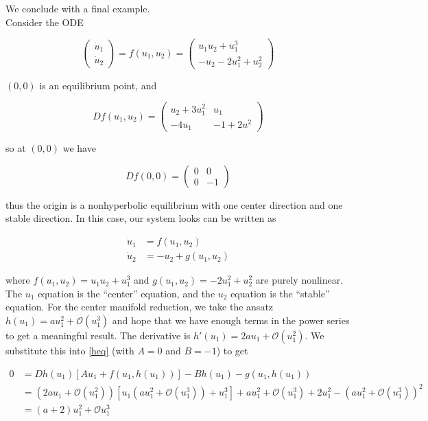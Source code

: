 \documentclass{article}
\begin{document}
We conclude with a final example.\\

Consider the ODE

\[
\begin{pmatrix}\dot{u}_1 \\ \dot{u}_2
\end{pmatrix}
= f(u_1, u_2)
= \begin{pmatrix} u_1 u_2 + u_1^3 \\ -u_2 - 2u_1^2 + u_2^2
\end{pmatrix}
\]

$(0,0)$ is an equilibrium point, and 

\[
Df(u_1, u_2) = \begin{pmatrix}
u_2 + 3 u_1^2 & u_1 \\
-4 u_1 & -1 + 2 u^2
\end{pmatrix}
\]

so at $(0, 0)$ we have

\[
Df(0, 0) = \begin{pmatrix}
0 & 0 \\
0 & -1
\end{pmatrix}
\]

thus the origin is a nonhyperbolic equilibrium with one center direction and one stable direction. In this case, our system looks can be written as

\begin{align*}
\dot{u}_1 &= f(u_1, u_2) \\
\dot{u}_2 &= -u_2 + g(u_1, u_2)
\end{align*}

where $f(u_1, u_2) = u_1 u_2 + u_1^3$ and $g(u_1, u_2) = - 2u_1^2 + u_2^2$ are purely nonlinear. The $u_1$ equation is the ``center'' equation, and the $u_2$ equation is the ``stable'' equation. For the center manifold reduction, we take the ansatz $h(u_1) = a u_1^2 + \mathcal{O}(u_1^3)$ and hope that we have enough terms in the power series to get a meaningful result. The derivative is $h'(u_1) = 2 a u_1 + \mathcal{O}(u_1^2)$. We substitute this into \eqref{heq} (with $A = 0$ and $B = -1$) to get

\begin{align*}
0 &= Dh(u_1) [ Au_1 + f(u_1, h(u_1))] - Bh(u_1) - g(u_1, h(u_1)) \\
&= ( 2 a u_1 + \mathcal{O}(u_1^2) )[ u_1 (a u_1^2 + \mathcal{O}(u_1^3)) + u_1^3 ] + a u_1^2 + \mathcal{O}(u_1^3) + 2u_1^2 - (a u_1^2 + \mathcal{O}(u_1^3))^2 \\
&= (a + 2) u_1^2 + \mathcal{O}u_1^3
\end{align*}
\end{document}
